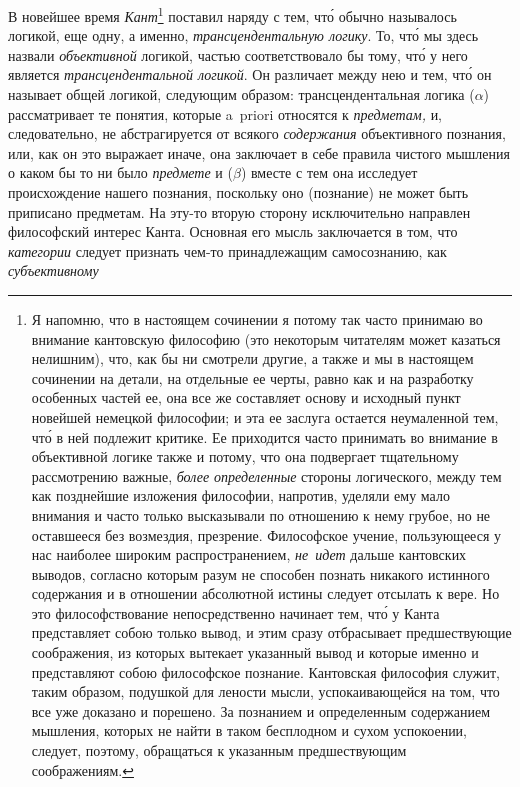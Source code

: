 В новейшее время {\em Кант}\footnote{
Я напомню, что в настоящем сочинении я потому так часто принимаю во
внимание кантовскую философию (это некоторым читателям может казаться
нелишним), что, как бы ни смотрели другие, а также и мы в настоящем
сочинении на детали, на отдельные ее черты, равно как и на разработку
особенных частей ее, она все же составляет основу и исходный пункт новейшей
немецкой философии; и эта ее заслуга остается неумаленной тем, чт\'{о} в ней
подлежит критике. Ее приходится часто принимать во внимание в объективной
логике также и потому, что она подвергает тщательному рассмотрению важные,
{\em более определенные} стороны логического, между тем как
позднейшие изложения философии, напротив, уделяли ему мало внимания и часто
только высказывали по отношению к нему грубое, но не оставшееся без
возмездия, презрение. Философское учение, пользующееся у нас наиболее
широким распространением, {\em не~идет} дальше кантовских
выводов, согласно которым разум не способен познать никакого истинного
содержания и в отношении абсолютной истины следует отсылать к вере. Но это
философствование непосредственно начинает тем, чт\'{о} у Канта представляет
собою только вывод, и этим сразу отбрасывает предшествующие соображения,
из которых вытекает указанный вывод и которые именно и представляют собою
философское познание. Кантовская философия служит, таким образом, подушкой
для лености мысли, успокаивающейся на том, что все уже доказано и порешено.
За познанием и определенным содержанием мышления, которых не найти в таком
бесплодном и сухом успокоении, следует, поэтому, обращаться к указанным
предшествующим соображениям.} поставил наряду с тем,
чт\'{о} обычно называлось логикой, еще одну, а именно,
{\em трансцендентальную логику}. То, чт\'{о} мы здесь
назвали {\em объективной} логикой, частью
соответствовало бы тому, чт\'{о} у него является
{\em трансцендентальной логикой}. Он различает между
нею и тем, чт\'{о} он называет общей логикой, следующим образом:
трансцендентальная логика ($\alpha$) рассматривает те понятия, которые
a~priori относятся к {\em предметам,} и, следовательно,
не абстрагируется от всякого {\em содержания}
объективного познания, или, как он это выражает иначе, она заключает в себе
правила чистого мышления о каком бы то ни было
{\em предмете} и ($\beta$) вместе с тем она исследует
происхождение нашего познания, поскольку оно (познание) не может быть
приписано предметам. На эту-то вторую сторону исключительно направлен
философский интерес Канта. Основная его мысль заключается в том, что
{\em категории} следует признать чем-то принадлежащим
самосознанию, как {\em субъективному}
